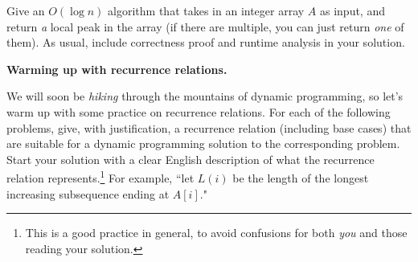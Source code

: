 \documentclass[11pt,addpoints,answers]{exam}
\begin{document}
\begin{questions}
\begin{parts}
    Give an $O(\log n)$ algorithm that takes in an integer array $A$ as input, and return \emph{a} local peak in the array (if there are multiple, you can just return\textit{ one} of them). As usual, include correctness proof and runtime analysis in your solution. 

  \begin{solution} \end{solution}

  \end{parts}


    \question \textbf{Warming up with recurrence relations.}
    
    We will soon be \emph{hiking} through the mountains of dynamic programming, so let’s warm up with some practice on recurrence relations. For each of the following problems, give, with justification, a recurrence relation (including base cases) that are suitable for a dynamic programming solution to the corresponding problem. Start your solution with a clear English description of what the recurrence relation represents.\footnote{This is a good practice in general, to avoid confusions for both \emph{you} and those reading your solution.} For example, ``let $L(i)$ be the length of the longest increasing subsequence ending at $A[i]$."

\end{questions}
\end{document}
